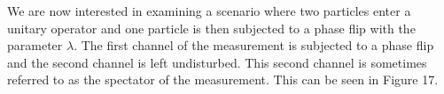 \documentclass[twocolumn]{article}
\begin{document}
We are now interested in examining a scenario where two particles enter a unitary operator and one particle is then subjected to a phase flip with the parameter $\lambda$. The first channel of the measurement is subjected to a phase flip and the second channel is left undisturbed. This second channel is sometimes referred to as the spectator of the measurement. This can be seen in Figure 17.
\newline
\begin{figure}[ht]
    \centering
\end{figure}
\end{document}

